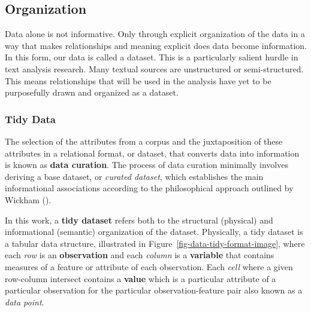\documentclass[
  letterpaper,
  krantz1]{latex/krantz-mod}
\theoremstyle{definition}
\theoremstyle{definition}
\theoremstyle{remark}
\begin{document}
\subsection{Organization}\label{sec-data-organization}

Data alone is not informative. Only through explicit
organization of the data in a way that makes relationships and meaning
explicit does data become information. In this form,
our data is called a dataset. This is a particularly salient hurdle in
text analysis research. Many textual sources are
unstructured or
semi-structured. This means relationships
that will be used in the analysis have yet to be purposefully drawn and
organized as a dataset.

\subsubsection{Tidy Data}\label{sec-data-tidy-data}

The selection of the attributes from a corpus and the juxtaposition of
these attributes in a relational format, or dataset, that converts data
into information is known as \textbf{data curation}. The process of data
curation minimally involves deriving a base dataset, or \emph{curated
dataset}, which establishes the main informational associations
according to the philosophical approach outlined by Wickham
().

In this work, a \textbf{tidy dataset} refers both to
the structural (physical) and informational (semantic) organization of
the dataset. Physically, a tidy dataset is a tabular data structure,
illustrated in Figure~\ref{fig-data-tidy-format-image}, where each
\emph{row} is an \textbf{observation} and each
\emph{column} is a \textbf{variable} that contains
measures of a feature or attribute of each observation. Each \emph{cell}
where a given row-column intersect contains a \textbf{value} which is a
particular attribute of a particular observation for the particular
observation-feature pair also known as a \emph{data point}.
\end{document}
